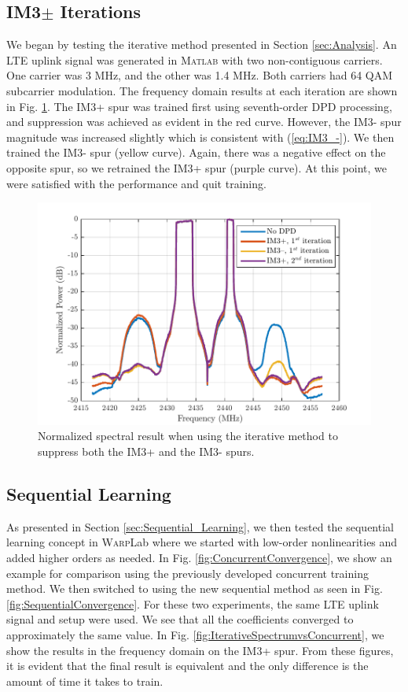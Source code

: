 \subsection{IM3$\pm$ Iterations}
We began by testing the iterative method presented in Section \ref{sec:Analysis}. 
An LTE uplink signal was generated in \textsc{Matlab} with two non-contiguous carriers. 
One carrier was 3 MHz, and the other was 1.4 MHz. 
Both carriers had 64 QAM subcarrier modulation. 
The frequency domain results at each iteration are shown in Fig. \ref{fig:RightThenLeft}. 
The IM3+ spur was trained first using seventh-order DPD processing, and suppression was achieved as evident in the red curve. 
However, the IM3- spur magnitude was increased slightly which is consistent with (\ref{eq:IM3_-}). 
We then trained the IM3- spur (yellow curve). 
Again, there was a negative effect on the opposite spur, so we retrained the IM3+ spur (purple curve). 
At this point, we were satisfied with the performance and quit training. 

\begin{figure}[t!] 
	\centering \includegraphics[width=0.9\columnwidth]{RightThenLeft_NEW}
	\caption{Normalized spectral result when using the iterative method to suppress both the IM3+ and the IM3- spurs.}
	\label{fig:RightThenLeft}
\end{figure}

\subsection{Sequential Learning}
As presented in Section \ref{sec:Sequential_Learning}, we then tested the sequential learning concept in \textsc{Warp}Lab where we started with low-order nonlinearities and added higher orders as needed. 
In Fig. \ref{fig:ConcurrentConvergence}, we show an example for comparison using the previously developed concurrent training method. 
We then switched to using the new sequential method as seen in Fig. \ref{fig:SequentialConvergence}. For these two experiments, the same LTE uplink signal and setup were used. 
We see that all the coefficients converged to approximately the same value. 
In Fig. \ref{fig:IterativeSpectrumvsConcurrent}, we show the results in the frequency domain on the IM3+ spur. 
From these figures, it is evident that the final result is equivalent and the only difference is the amount of time it takes to train.

